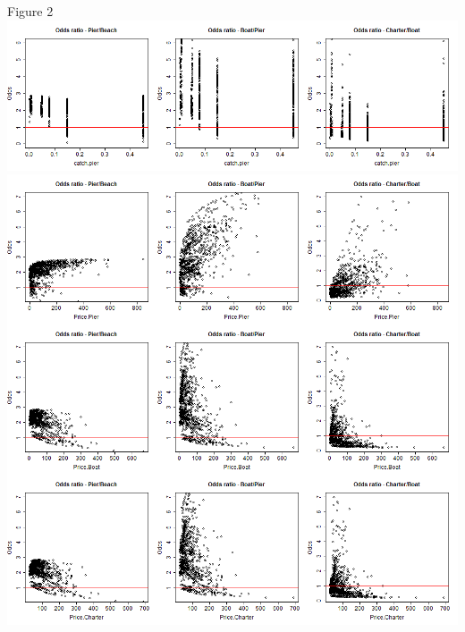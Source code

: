 \documentclass[12pt]{article}
\begin{document}
{Figure 2\\
\includegraphics[scale=0.47]{Ordered Odds 3}\\
\includegraphics[scale=0.47]{Ordered Odds 2}





}
\end{document}
